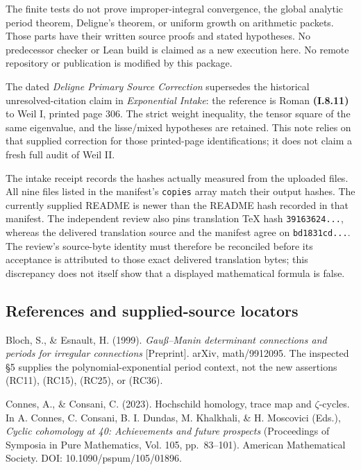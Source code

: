 The finite tests do not prove improper-integral convergence, the global analytic period theorem, Deligne's theorem, or uniform growth on arithmetic packets. Those parts have their written source proofs and stated hypotheses. No predecessor checker or Lean build is claimed as a new execution here. No remote repository or publication is modified by this package.

The dated \emph{Deligne Primary Source Correction} supersedes the historical unresolved-citation claim in \emph{Exponential Intake}: the reference is Roman \textbf{(I.8.11)} to Weil I, printed page 306. The strict weight inequality, the tensor square of the same eigenvalue, and the lisse/mixed hypotheses are retained. This note relies on that supplied correction for those printed-page identifications; it does not claim a fresh full audit of Weil II.

The intake receipt records the hashes actually measured from the uploaded files. All nine files listed in the manifest's \nolinkurl{copies} array match their output hashes. The currently supplied README is newer than the README hash recorded in that manifest. The independent review also pins translation TeX hash \nolinkurl{39163624...}, whereas the delivered translation source and the manifest agree on \nolinkurl{bd1831cd...}. The review's source-byte identity must therefore be reconciled before its acceptance is attributed to those exact delivered translation bytes; this discrepancy does not itself show that a displayed mathematical formula is false.

\subsection{References and supplied-source locators}\label{endpoint-residue_original--references-and-supplied-source-locators}

Bloch, S., \& Esnault, H. (1999). \emph{Gauß--Manin determinant connections and periods for irregular connections} {[}Preprint{]}. arXiv, math/9912095. The inspected §5 supplies the polynomial-exponential period context, not the new assertions (RC11), (RC15), (RC25), or (RC36).

Connes, A., \& Consani, C. (2023). Hochschild homology, trace map and \(\zeta\)-cycles. In A. Connes, C. Consani, B. I. Dundas, M. Khalkhali, \& H. Moscovici (Eds.), \emph{Cyclic cohomology at 40: Achievements and future prospects} (Proceedings of Symposia in Pure Mathematics, Vol. 105, pp.~83--101). American Mathematical Society. DOI: 10.1090/pspum/105/01896.

